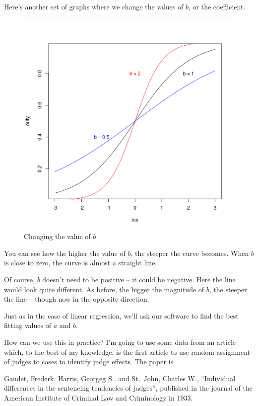 \documentclass[12pt,twoside]{article}
\begin{document}
Here's another set of graphs where we change the values of \(b\), or the
coefficient.

\begin{figure}[htbp]
\centering
\includegraphics{figure/logitplots2-1.png}
\caption{Changing the value of \(b\)}
\end{figure}

You can see how the higher the value of \(b\), the steeper the curve
becomes. When \(b\) is close to zero, the curve is almost a straight
line.

Of course, \(b\) doesn't need to be positive -- it could be negative.
Here the line would look quite different. As before, the bigger the
magnitude of \(b\), the steeper the line -- though now in the opposite
direction.

Just as in the case of linear regression, we'll ask our software to find
the best fitting values of \(a\) and \(b\).

How can we use this in practice? I'm going to use some data from an
article which, to the best of my knowledge, is the first article to use
random assignment of judges to cases to identify judge effects. The
paper is

Gaudet, Frederk, Harris, Georgeg S., and St.~John, Charles W.,
``Individual differences in the sentencing tendencies of judges'',
published in the journal of the American Institute of Criminal Law and
Criminology in 1933.
\end{document}
